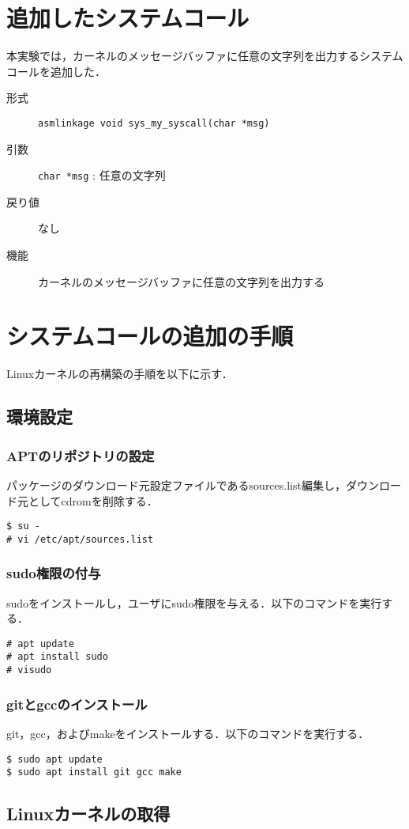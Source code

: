 \documentclass[12pt]{jsarticle}
\begin{document}
\section{追加したシステムコール}
本実験では，カーネルのメッセージバッファに任意の文字列を出力するシステムコールを追加した．
\begin{description}
	\item[形式] \verb|asmlinkage void sys_my_syscall(char *msg)|
	\item[引数] \verb|char *msg| : 任意の文字列
	\item[戻り値] なし
	\item[機能] カーネルのメッセージバッファに任意の文字列を出力する
\end{description}
\section{システムコールの追加の手順}
Linuxカーネルの再構築の手順を以下に示す．
\subsection{環境設定}
\subsubsection{APTのリポジトリの設定}
パッケージのダウンロード元設定ファイルであるsources.list編集し，ダウンロード元としてcdromを削除する．
\begin{verbatim}
$ su -
# vi /etc/apt/sources.list
\end{verbatim}

\subsubsection{sudo権限の付与}
sudoをインストールし，ユーザにsudo権限を与える．以下のコマンドを実行する．
\begin{verbatim}
# apt update
# apt install sudo 
# visudo
\end{verbatim}

\subsubsection{gitとgccのインストール}
git，gcc，およびmakeをインストールする．以下のコマンドを実行する．
\begin{verbatim}
$ sudo apt update
$ sudo apt install git gcc make
\end{verbatim}

\subsection{Linuxカーネルの取得}
\end{document}
